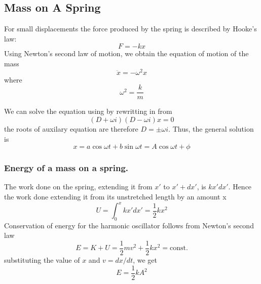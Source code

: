 \documentclass[../../../main.tex]{subfiles}
\begin{document}
\subsection{Mass on A Spring}
For small displacements the force produced by the spring is described by Hooke's law:
\begin{equation*}
    F = -kx 
\end{equation*}
Using Newton's second law of motion, we obtain the equation of motion of the mass
\begin{equation*}
   \ddot{x}=-\omega^2 x
\end{equation*}
where\begin{equation*}
    \omega^2=\frac{k}{m}
\end{equation*}

We can solve the equation using by rewritting in from
\begin{equation*}
    (D+\omega i)(D-\omega i)x=0
\end{equation*}
the roots of auxilary equation are therefore $D=\pm \omega i$. Thus, the general solution is
\begin{equation*}
    x=a\cos \omega t+ b \sin \omega t= A\cos \omega t +\phi
\end{equation*}

\subsubsection{Energy of a mass on a spring.} The work done on the spring, extending it from $x'$ to $ x' + dx'$, is $kx'dx'$. Hence the work done extending it from its unstretched length by an amount x
\begin{equation*}
    U=\int_{0}^{x}kx'dx'= \frac{1}{2} kx^2
\end{equation*}
Conservation of energy for the harmonic oscillator follows from Newton's second law
\begin{equation*}
    E=K+U=\frac{1}{2}mv^2+\frac{1}{2}kx^2=\text{const.}
\end{equation*}
substituting the value of $x$ and $v=dx/dt$, we get
\begin{equation*}
    E=\frac{1}{2}kA^2
\end{equation*}
\end{document}
